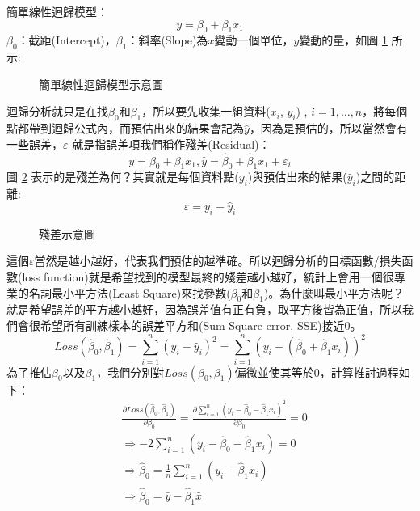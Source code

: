 \documentclass[12pt, a4paper]{article}
\begin{document}
簡單線性迴歸模型：$$y=\beta_0+\beta_1 x_1$$
$\beta_0$：截距(Intercept)，$\beta_1$：斜率(Slope)為$x$變動一個單位，$y$變動的量，如圖 \ref{fig:simplelinearregression} 所示:
\begin{figure}[H]
    \caption{簡單線性迴歸模型示意圖}
    \label{fig:simplelinearregression}
\end{figure}
迴歸分析就只是在找$\beta_0$和$\beta_1$，所以要先收集一組資料($x_i$, $y_i$) , $i=1, …,n$，將每個點都帶到迴歸公式內，而預估出來的結果會記為$\hat{y}$，因為是預估的，所以當然會有一些誤差，$\varepsilon$ 就是指誤差項我們稱作殘差(Residual)：
$$y=\beta_0+\beta_1 x_1,\hat{y}=\hat{\beta}_0+\hat{\beta}_1 x_1+\varepsilon_i$$
圖 \ref{fig:simplelinearregression2} 表示的是殘差為何？其實就是每個資料點($y_i$)與預估出來的結果($\hat{y}_i$)之間的距離:
$$\varepsilon=y_i-\hat{y}_i$$
\begin{figure}[H]
    \caption{殘差示意圖}
    \label{fig:simplelinearregression2}
\end{figure}
這個$\varepsilon$當然是越小越好，代表我們預估的越準確。所以迴歸分析的目標函數/損失函數(loss function)就是希望找到的模型最終的殘差越小越好，統計上會用一個很專業的名詞最小平方法(Least Square)來找參數($\beta_0$和$\beta_1$)。為什麼叫最小平方法呢？就是希望誤差的平方越小越好，因為誤差值有正有負，取平方後皆為正值，所以我們會很希望所有訓練樣本的誤差平方和(Sum Square error, SSE)接近0。
$$Loss\left(\hat{\beta}_0,\hat{\beta}_1\right)=\sum_{i=1}^n\left(y_i-\hat{y}_i\right)^2=\sum_{i=1}^n\left(y_i-\left(\hat{\beta}_0+\hat{\beta}_1x_i\right)\right)^2$$
為了推估$\beta_0$以及$\beta_1$，我們分別對$Loss(\beta_0,\beta_1)$偏微並使其等於0，計算推討過程如下：
\begin{align*}
&\frac{\partial Loss\left(\hat{\beta}_0,\hat{\beta}_1\right)}{\partial \beta_0}=\frac{\partial \sum_{i=1}^n\left(y_i-\hat{\beta}_0-\hat{\beta}_1x_i\right)^2}{\partial \beta_0}=0\\
&\Rightarrow -2\sum_{i=1}^n\left(y_i-\hat{\beta}_0-\hat{\beta}_1x_i\right)=0\\
&\Rightarrow \hat{\beta}_0=\frac{1}{n}\sum_{i=1}^n\left(y_i-\hat{\beta}_1x_i\right)\\
&\Rightarrow \hat{\beta}_0=\bar{y}-\hat{\beta}_1\bar{x}
\end{align*}
\end{document}
